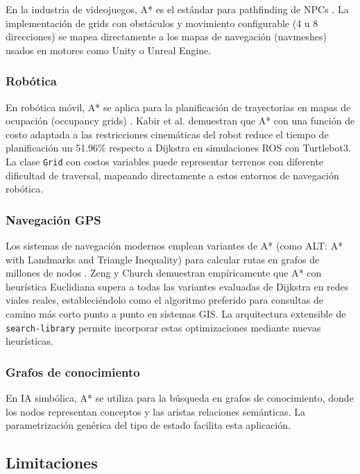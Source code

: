 En la industria de videojuegos, A* es el estándar para pathfinding de NPCs \cite{millington2019ai}. La implementación de grids con obstáculos y movimiento configurable (4 u 8 direcciones) se mapea directamente a los mapas de navegación (navmeshes) usados en motores como Unity o Unreal Engine.

\subsubsection{Robótica}

En robótica móvil, A* se aplica para la planificación de trayectorias en mapas de ocupación (occupancy grids) \cite{lavalle2006planning}. Kabir et al. \cite{kabir2024enhanced} demuestran que A* con una función de costo adaptada a las restricciones cinemáticas del robot reduce el tiempo de planificación un 51.96\% respecto a Dijkstra en simulaciones ROS con Turtlebot3. La clase \texttt{Grid} con costos variables puede representar terrenos con diferente dificultad de traversal, mapeando directamente a estos entornos de navegación robótica.

\subsubsection{Navegación GPS}

Los sistemas de navegación modernos emplean variantes de A* (como ALT: A* with Landmarks and Triangle Inequality) para calcular rutas en grafos de millones de nodos \cite{bast2016route}. Zeng y Church \cite{zeng2009finding} demuestran empíricamente que A* con heurística Euclidiana supera a todas las variantes evaluadas de Dijkstra en redes viales reales, estableciéndolo como el algoritmo preferido para consultas de camino más corto punto a punto en sistemas GIS. La arquitectura extensible de \texttt{search-library} permite incorporar estas optimizaciones mediante nuevas heurísticas.

\subsubsection{Grafos de conocimiento}

En IA simbólica, A* se utiliza para la búsqueda en grafos de conocimiento, donde los nodos representan conceptos y las aristas relaciones semánticas. La parametrización genérica del tipo de estado facilita esta aplicación.

\subsection{Limitaciones}

